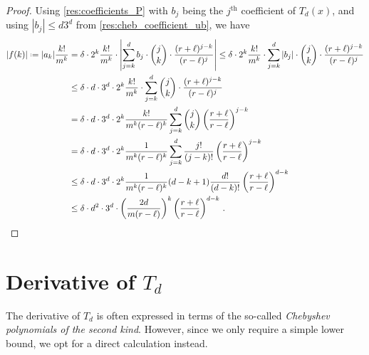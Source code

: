 \documentclass[10pt,a4paper]{article}
\newcommand*{\define}{\mathrel{\vcenter{\baselineskip0.5ex \lineskiplimit0pt
                      \hbox{\scriptsize.}\hbox{\scriptsize.}}}%
                      =}
\DeclarePairedDelimiter{\abs}{\lvert}{\rvert}
\begin{document}
\resmaxu*
\begin{proof}
Using \cref{res:coefficients_P} with $b_j$
being the $j^\text{th}$ coefficient of $T_d(x)$, and using $|b_j| \leq d 3^d$ from
\cref{res:cheb_coefficient_ub}, we have 
\begin{align*}
  |f(k)| \define |a_k| \frac{k!}{m^k}
      &= \delta \cdot 2^k \frac{k!}{m^k} \cdot \abs*{ \sum_{j=k}^d b_j \cdot \binom{j}{k}
          \cdot \frac{(r+\ell)^{j-k}}{(r-\ell)^j}} 
      \leq \delta \cdot 2^k \frac{k!}{m^k} \cdot \sum_{j=k}^d |b_j| \cdot \binom{j}{k}
          \cdot \frac{(r+\ell)^{j-k}}{(r-\ell)^j} \\
      &\leq \delta \cdot d \cdot 3^d \cdot 2^k \frac{k!}{m^k}
          \cdot \sum_{j=k}^d  \binom{j}{k} \cdot \frac{(r+\ell)^{j-k}}{(r-\ell)^j} \\
      &=  \delta \cdot d \cdot 3^d \cdot 2^k \frac{k!}{m^k (r-\ell)^k}
         \sum_{j=k}^d \binom{j}{k} \left(\frac{r+\ell}{r-\ell}\right)^{j-k} \\
      &=  \delta \cdot d \cdot 3^d \cdot 2^k \frac{1}{m^k (r-\ell)^k}
         \sum_{j=k}^d \frac{j!}{(j-k)!} \left(\frac{r+\ell}{r-\ell}\right)^{j-k} \\
      &\leq  \delta \cdot d \cdot 3^d \cdot 2^k \frac{1}{m^k (r-\ell)^k} (d-k+1) \frac{d!}{(d-k)!}
         \left(\frac{r+\ell}{r-\ell}\right)^{d-k} \\
      &\leq  \delta \cdot d^2 \cdot 3^d \cdot \left( \frac{2d}{m (r-\ell)} \right)^k
         \left(\frac{r+\ell}{r-\ell}\right)^{d-k} \,. \qedhere
\end{align*}
\end{proof}

\section{Derivative of \texorpdfstring{$T_d$}{Td}}
\label{section:td-prime}

The derivative of $T_d$ is often expressed in terms of the so-called \emph{Chebyshev polynomials of
the second kind}. However, since we only require a simple lower bound, we opt for a direct
calculation instead.
\end{document}
